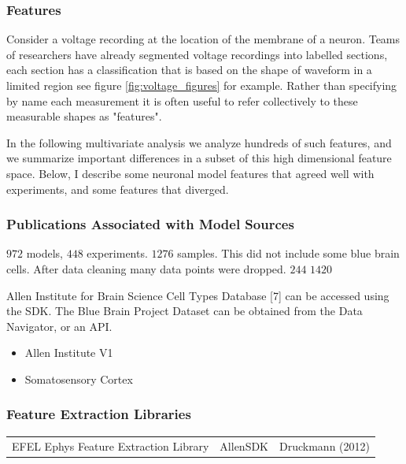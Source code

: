 \subsubsection{Features} 
Consider a voltage recording at the location of the membrane of a neuron. Teams of researchers have already segmented voltage recordings into labelled sections, each section has a classification that is based on the shape of waveform in a limited region see figure \ref{fig:voltage_figures} for example. Rather than specifying by name each measurement it is often useful to refer collectively to these measurable shapes as "features". 

In the following multivariate analysis we analyze hundreds of such features, and we summarize important differences in a subset of this high dimensional feature space.  Below, I describe some neuronal model features that agreed well with experiments, and some features that diverged.


\subsubsection{Publications Associated with Model Sources}
$972$ models, $448$ experiments.
$1276$ samples. This did not include some blue brain cells. After data cleaning many data points were dropped.  $244$
$1420$


Allen Institute for Brain Science Cell Types Database [7] can be accessed using the SDK.  The Blue Brain Project Dataset can be obtained from the Data Navigator, or an API.

\begin{itemize}
\item Allen Institute V1 \cite{gouwens2018systematic}
\item Somatosensory Cortex \cite{markram2015} 
\end{itemize}

\subsubsection{Feature Extraction Libraries}
\begin{table}
\centering
\begin{tabular}{lll}
{} EFEL Ephys Feature Extraction Library & AllenSDK & Druckmann (2012) 
\end{tabular}
\end{table}




